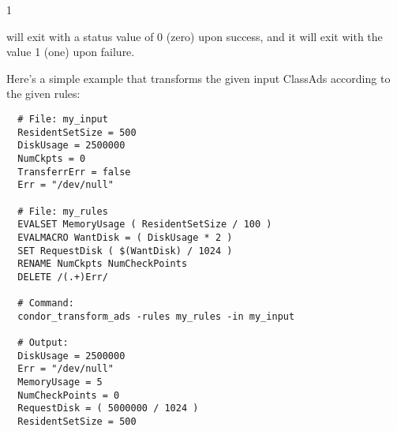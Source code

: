 \begin{ManPage}{\label{man-condor-transform-ads}}{1}
\ExitStatus

 will exit with a status value of 0 (zero) upon success,
and it will exit with the value 1 (one) upon failure.

\Examples

Here's a simple example that transforms the given input ClassAds according
to the given rules:

\begin{verbatim}
  # File: my_input
  ResidentSetSize = 500
  DiskUsage = 2500000
  NumCkpts = 0
  TransferrErr = false
  Err = "/dev/null"

  # File: my_rules
  EVALSET MemoryUsage ( ResidentSetSize / 100 )
  EVALMACRO WantDisk = ( DiskUsage * 2 )
  SET RequestDisk ( $(WantDisk) / 1024 )
  RENAME NumCkpts NumCheckPoints
  DELETE /(.+)Err/

  # Command:
  condor_transform_ads -rules my_rules -in my_input

  # Output:
  DiskUsage = 2500000
  Err = "/dev/null"
  MemoryUsage = 5
  NumCheckPoints = 0
  RequestDisk = ( 5000000 / 1024 )
  ResidentSetSize = 500
\end{verbatim}

\end{ManPage}

